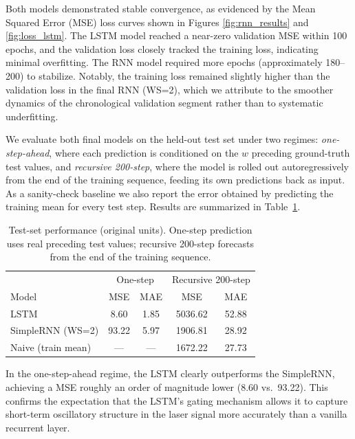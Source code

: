 \documentclass[conference]{IEEEtran}
\begin{document}
Both models demonstrated stable convergence, as evidenced by the Mean Squared Error (MSE) loss curves shown in Figures \ref{fig:rnn_results} and \ref{fig:loss_lstm}. The LSTM model reached a near-zero validation MSE within 100 epochs, and the validation loss closely tracked the training loss, indicating minimal overfitting. The RNN model required more epochs (approximately 180--200) to stabilize. Notably, the training loss remained slightly higher than the validation loss in the final RNN (WS=2), which we attribute to the smoother dynamics of the chronological validation segment rather than to systematic underfitting.

We evaluate both final models on the held-out test set under two regimes: \emph{one-step-ahead}, where each prediction is conditioned on the $w$ preceding ground-truth test values, and \emph{recursive 200-step}, where the model is rolled out autoregressively from the end of the training sequence, feeding its own predictions back as input. As a sanity-check baseline we also report the error obtained by predicting the training mean for every test step. Results are summarized in Table~\ref{tab:test_metrics}.

\begin{table}[h]
    \centering
    \caption{Test-set performance (original units). One-step prediction uses real preceding test values; recursive 200-step forecasts from the end of the training sequence.}
    \label{tab:test_metrics}
    \begin{tabular}{lcccc}
        \hline
         & \multicolumn{2}{c}{One-step} & \multicolumn{2}{c}{Recursive 200-step} \\
        Model & MSE & MAE & MSE & MAE \\
        \hline
        LSTM             & 8.60   & 1.85  & 5036.62 & 52.88 \\
        SimpleRNN (WS=2) & 93.22  & 5.97  & 1906.81 & 28.92 \\
        Naive (train mean) & --- & --- & 1672.22 & 27.73 \\
        \hline
    \end{tabular}
\end{table}

In the one-step-ahead regime, the LSTM clearly outperforms the SimpleRNN, achieving a MSE roughly an order of magnitude lower (8.60 vs.\ 93.22). This confirms the expectation that the LSTM's gating mechanism allows it to capture short-term oscillatory structure in the laser signal more accurately than a vanilla recurrent layer.
\end{document}
